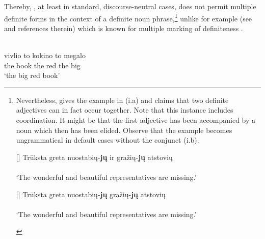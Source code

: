 \documentclass[output=paper,
modfonts
]{langscibook}
\begin{document}
Thereby, , at least in standard, discourse-neutral cases, does not permit multiple definite forms in the context of a definite noun phrase,\footnote{Nevertheless, \citet{Stolz2008} gives the example in (i.a) and claims that two definite adjectives can in fact occur together. Note that this instance includes coordination. It might be that the first adjective has been accompanied by a noun which then has been elided. Observe that the example becomes ungrammatical in default cases without the conjunct (i.b).
	
\begin{exe} \footnotesize 
{} 
\begin{xlist}
[]{\label{ex:sereikaite:i} \footnotesize
\gll Trūksta greta nuostabių-\textbf{jų} ir gražių-\textbf{jų} atstovių\\ 
     \\
\trans \normalfont `The wonderful and beautiful representatives are missing.' \citep[adapted from][226]{Stolz2008}} 

[\fts{*}]{\label{ex:sereikaite:ii} \footnotesize
\gll Trūksta greta nuostabių-\textbf{jų} gražių-\textbf{jų} atstovių\\
    \\
\trans \normalfont `The wonderful and beautiful representatives are missing.' \citep[adapted from][226]{Stolz2008}} 
\end{xlist} 
\end{exe}} unlike for example  (see \citet{Alexiadou2014} and references therein) which is known for multiple marking of definiteness .

\begin{exe}
\ex \label{ex:sereikaite:10}
 \citep[19]{Alexiadou2014} \\
 {vivlio} {to} {kokino} {to} {megalo}\\
the book the red the big\\
\trans `the big red book' 
\end{exe}
\end{document}
